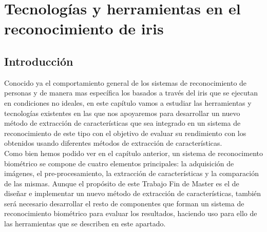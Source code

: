 
\chapter{Tecnologías y herramientas en el reconocimiento de iris} %

\label{Capítulo 3} %




\section{Introducción}

Conocido ya el comportamiento general de los sistemas de reconocimiento de personas y de manera mas específica los basados a través del iris que se ejecutan en condiciones no ideales, en este capítulo vamos a estudiar las herramientas y tecnologías existentes en las que nos apoyaremos para desarrollar un nuevo método de extracción de características que sea integrado en un sistema de reconocimiento de este tipo con el objetivo de evaluar su rendimiento con los obtenidos usando diferentes métodos de extracción de características. \\

Como bien hemos podido ver en el capítulo anterior, un sistema de reconocimento biométrico se compone de cuatro elementos principales: la adquisición de imágenes, el pre-procesamiento, la extracción de características y la comparación de las mismas. Aunque el propósito de este Trabajo Fin de Master es el de diseñar e implementar un nuevo método de extracción de características, también será necesario desarrollar el resto de componentes que forman un sistema de reconocimiento biométrico para evaluar los resultados, haciendo uso para ello de las herramientas que se describen en este apartado.\\ 


